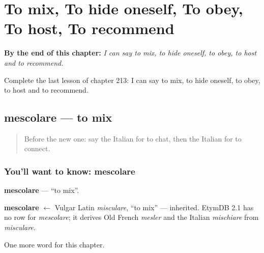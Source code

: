 
\chapter{To mix, To hide oneself, To obey, To host, To recommend}
\label{ch:it-to-mix-to-hide-oneself-to-obey-to-host-to-recommend}

\begin{chapteropening}
\textbf{By the end of this chapter:} \emph{I can say to mix, to hide oneself, to obey, to host and to recommend.}

Complete the last lesson of chapter 213: I can say to mix, to hide oneself, to obey, to host and to recommend.
\end{chapteropening}

\section[mescolare]{mescolare — to mix}

\label{lesson:IT-C213-mescolare}



\begin{quote}
Before the new one: say the Italian for to chat, then the Italian for to connect.
\end{quote}

\subsection*{You'll want to know: mescolare}
\textbf{mescolare} — \textquotedblleft{}to mix\textquotedblright{}.

\begin{cousinweb}
\textbf{mescolare} $\leftarrow$ Vulgar Latin \emph{misculare}, \textquotedblleft{}to mix\textquotedblright{} — inherited. EtymDB 2.1 has no row for \emph{mescolare}; it derives Old French \emph{mesler} and the Italian \emph{mischiare} from \emph{misculare}.
\end{cousinweb}

\begin{grammarlens}[title={What you've built}]
One more word for this chapter.
\end{grammarlens}

